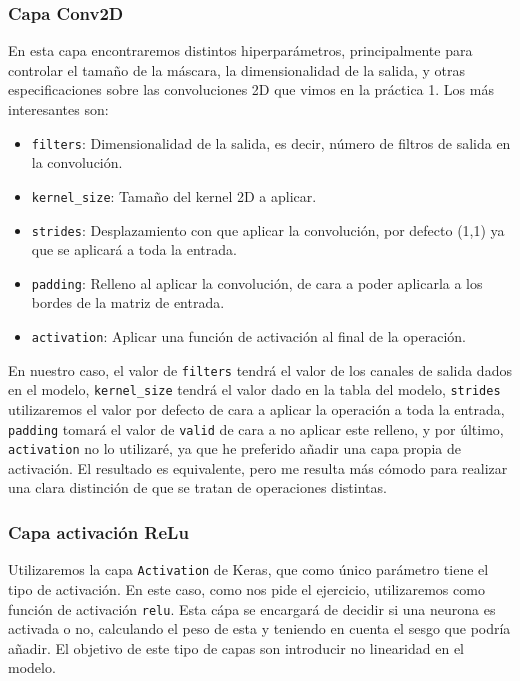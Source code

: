 \documentclass[12pt, spanish]{article}
\begin{document}
\subsubsection{Capa Conv2D}

En esta capa encontraremos distintos hiperparámetros, principalmente para controlar el tamaño de la máscara, la dimensionalidad de la salida, y otras especificaciones sobre las convoluciones 2D que vimos en la práctica 1. Los más interesantes son:

\begin{itemize}
	\item \texttt{filters}: Dimensionalidad de la salida, es decir, número de filtros de salida en la convolución.
	\item \texttt{kernel\_size}: Tamaño del kernel 2D a aplicar.
	\item \texttt{strides}: Desplazamiento con que aplicar la convolución, por defecto (1,1) ya que se aplicará a toda la entrada.
	\item \texttt{padding}: Relleno al aplicar la convolución, de cara a poder aplicarla a los bordes de la matriz de entrada.
	\item \texttt{activation}: Aplicar una función de activación al final de la operación.

\end{itemize}

En nuestro caso, el valor de \texttt{filters} tendrá el valor de los canales de salida dados en el modelo, \texttt{kernel\_size} tendrá el valor dado en la tabla del modelo, \texttt{strides} utilizaremos el valor por defecto de cara a aplicar la operación a toda la entrada, \texttt{padding} tomará el valor de \texttt{valid} de cara a no aplicar este relleno, y por último, \texttt{activation} no lo utilizaré, ya que he preferido añadir una capa propia de activación. El resultado es equivalente, pero me resulta más cómodo para realizar una clara distinción de que se tratan de operaciones distintas.

\subsubsection{Capa activación ReLu}

Utilizaremos la capa \texttt{Activation} de Keras, que como único parámetro tiene el tipo de activación. En este caso, como nos pide el ejercicio, utilizaremos como función de activación \texttt{relu}. Esta cápa se encargará de decidir si una neurona es activada o no, calculando el peso de esta y teniendo en cuenta el sesgo que podría añadir. El objetivo de este tipo de capas son introducir no linearidad en el modelo.
\end{document}
